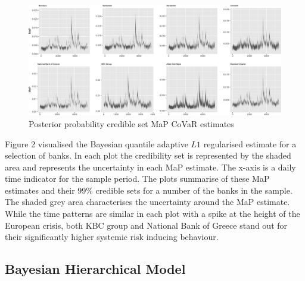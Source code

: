 \documentclass[
  10pt,
]{article}
\begin{document}
\begin{figure}
\centering
\includegraphics{figures/paper-fig2-1.png}
\caption{Posterior probability credible set MaP CoVaR estimates}
\end{figure}

Figure 2 visualised the Bayesian quantile adaptive \(L1\) regularised
estimate for a selection of banks. In each plot the credibility set is
represented by the shaded area and represents the uncertainty in each
MaP estimate. The x-axis is a daily time indicator for the sample
period. The plots summarise of these MaP estimates and their 99\%
credible sets for a number of the banks in the sample. The shaded grey
area characterises the uncertainty around the MaP estimate. While the
time patterns are similar in each plot with a spike at the height of the
European crisis, both KBC group and National Bank of Greece stand out
for their significantly higher systemic risk inducing behaviour.

\hypertarget{bayesian-hierarchical-model}{%
\subsection{Bayesian Hierarchical
Model}\label{bayesian-hierarchical-model}}
\end{document}
